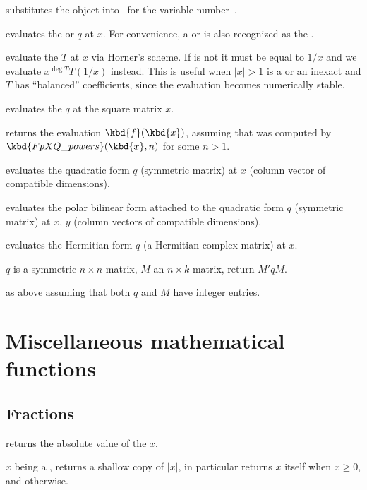  substitutes the object 
into~ for the variable number~.

 evaluates the  or 
$q$ at $x$. For convenience, a  or  is also recognized as
the  .

 evaluate the  $T$
at $x$ via Horner's scheme. If  is not  it must be equal to
$1/x$ and we evaluate $x^{\deg T}T(1/x)$ instead. This is useful when
$|x| > 1$ is a  or an inexact  and $T$ has
``balanced'' coefficients, since the evaluation becomes numerically stable.

 evaluates the  $q$ at the
square matrix $x$.

 returns
the evaluation $\kbd{f}(\kbd{x})$, assuming that  was computed by
$\kbd{FpXQ\_powers}(\kbd{x}, n)$ for some $n>1$.

 evaluates the quadratic form
$q$ (symmetric matrix) at $x$ (column vector of compatible dimensions).

 evaluates the polar bilinear form
attached to the quadratic form $q$ (symmetric matrix) at $x$, $y$ (column
vectors of compatible dimensions).

 evaluates the Hermitian form $q$
(a Hermitian complex matrix) at $x$.

 $q$ is a symmetric $n\times n$ matrix,
$M$ an $n\times k$ matrix, return $M' q M$.

 as above assuming that both
$q$ and $M$ have integer entries.

\newpage
\chapter{Miscellaneous mathematical functions}

\section{Fractions}

 returns the absolute value of the  $x$.

 $x$ being a , returns a shallow
copy of $|x|$, in particular returns $x$ itself when $x \geq 0$, and
 otherwise.


